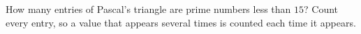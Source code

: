 How many entries of Pascal's triangle are prime numbers less than $15$? Count every entry, so a value that appears several times is counted each time it appears.
